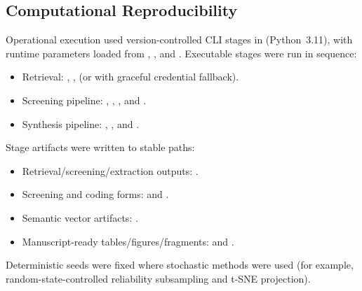 \documentclass[11pt]{article}
\begin{document}
\subsection{Computational Reproducibility}
Operational execution used version-controlled CLI stages in  (Python~3.11), with runtime parameters loaded from , , and . Executable stages were run in sequence:
\begin{itemize}[leftmargin=*, noitemsep]
  \item Retrieval: , ,  (or  with graceful credential fallback).
  \item Screening pipeline: , , , and .
  \item Synthesis pipeline: , , and .
\end{itemize}

Stage artifacts were written to stable paths:
\begin{itemize}[leftmargin=*, noitemsep]
  \item Retrieval/screening/extraction outputs: .
  \item Screening and coding forms:  and .
  \item Semantic vector artifacts: .
  \item Manuscript-ready tables/figures/fragments:  and .
\end{itemize}

Deterministic seeds were fixed where stochastic methods were used (for example, random-state-controlled reliability subsampling and t-SNE projection).
\end{document}
